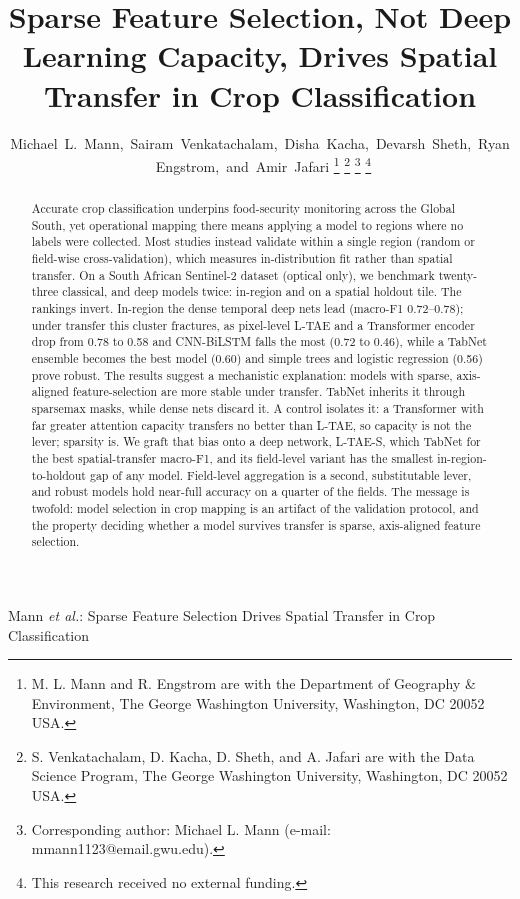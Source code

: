 \documentclass[journal]{IEEEtran}
\begin{document}
\title{Sparse Feature Selection, Not Deep Learning Capacity, Drives Spatial Transfer in Crop Classification}

\author{Michael~L.~Mann,~Sairam~Venkatachalam,~Disha~Kacha,~Devarsh~Sheth,~Ryan~Engstrom,~and~Amir~Jafari
\thanks{M. L. Mann and R. Engstrom are with the Department of Geography \& Environment, The George Washington University, Washington, DC 20052 USA.}
\thanks{S. Venkatachalam, D. Kacha, D. Sheth, and A. Jafari are with the Data Science Program, The George Washington University, Washington, DC 20052 USA.}
\thanks{Corresponding author: Michael L. Mann (e-mail: mmann1123@email.gwu.edu).}
\thanks{This research received no external funding.}}

%
{Mann \MakeLowercase{\textit{et al.}}: Sparse Feature Selection Drives Spatial Transfer in Crop Classification}

\maketitle

\begin{abstract}
Accurate crop classification underpins food-security monitoring across the Global South, yet operational mapping there means applying a model to regions where no labels were collected. Most studies instead validate within a single region (random or field-wise cross-validation), which measures in-distribution fit rather than spatial transfer. On a South African Sentinel-2 dataset (optical only), we benchmark twenty-three classical, and deep models twice: in-region and on a spatial holdout tile. The rankings invert. In-region the dense temporal deep nets lead (macro-F1 0.72--0.78); under transfer this cluster fractures, as pixel-level L-TAE and a Transformer encoder drop from 0.78 to 0.58 and CNN-BiLSTM falls the most (0.72 to 0.46), while a TabNet ensemble becomes the best model (0.60) and simple trees and logistic regression (0.56) prove robust. The results suggest a mechanistic explanation: models with sparse, axis-aligned feature-selection are more stable under transfer. TabNet inherits it through sparsemax masks, while dense nets discard it. A control isolates it: a Transformer with far greater attention capacity transfers no better than L-TAE, so capacity is not the lever; sparsity is. We graft that bias onto a deep network, L-TAE-S, which TabNet for the best spatial-transfer macro-F1, and its field-level variant has the smallest in-region-to-holdout gap of any model. Field-level aggregation is a second, substitutable lever, and robust models hold near-full accuracy on a quarter of the fields. The message is twofold: model selection in crop mapping is an artifact of the validation protocol, and the property deciding whether a model survives transfer is sparse, axis-aligned feature selection.
\end{abstract}
\end{document}
